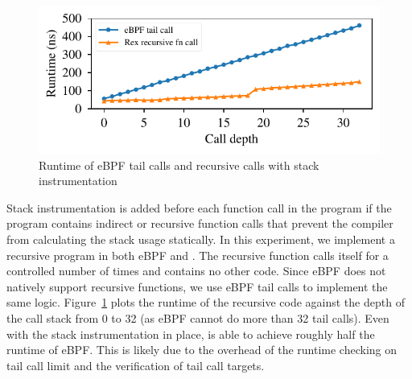 \begin{figure}[t]
    \includegraphics[width=1.0\linewidth]{figs/recursive.pdf}
    \centering
    \vspace{-25pt}
    \caption{Runtime of eBPF tail calls and \projname{} recursive calls with
    stack instrumentation}
    \label{fig:eval-recursion}
    \vspace{-10pt}
\end{figure}
Stack instrumentation is added before each
    function call in the \projname{} program if the program contains indirect
    or recursive function calls that prevent the compiler from calculating the
    stack usage statically.
In this experiment, we implement a recursive program in both
    eBPF and \projname{}.
The recursive function calls itself for a controlled number of times and contains
    no other code.
Since eBPF does not natively support recursive functions, we use eBPF tail
    calls to implement the same logic.
Figure~\ref{fig:eval-recursion} plots the runtime of the recursive code against
    the depth of the call stack from 0 to 32 (as eBPF cannot do more than 32
    tail calls).
Even with the stack instrumentation in place, \projname{} is able to
    achieve roughly half the runtime of eBPF.
This is likely due to the overhead of the runtime checking on tail
    call limit and the verification of tail call targets.
